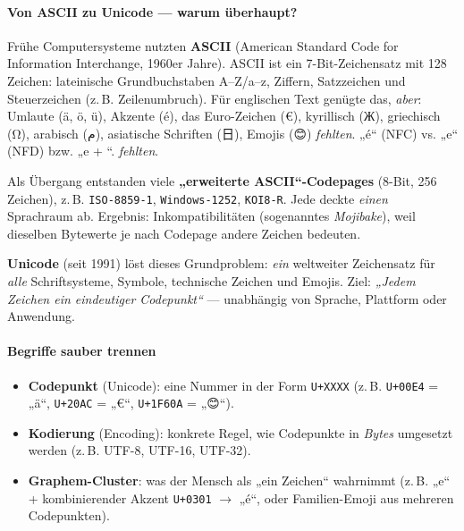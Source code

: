 \documentclass[../skript/main.tex]{subfiles}
\begin{document}
\paragraph{Von ASCII zu Unicode — warum überhaupt?}
Frühe Computersysteme nutzten \textbf{ASCII} (American Standard Code for Information Interchange, 1960er Jahre). ASCII ist ein 7-Bit-Zeichensatz mit 128 Zeichen: lateinische Grundbuchstaben A–Z/a–z, Ziffern, Satzzeichen und Steuerzeichen (z.\,B. Zeilenumbruch). Für englischen Text genügte das, \emph{aber}:
Umlaute (ä, ö, ü), Akzente (é), das Euro-Zeichen (€), kyrillisch (Ж), griechisch (Ω), arabisch ({\arabicfont م}), asiatische Schriften ({\cjkfont 日}), Emojis ({\emojifont 😊}) \emph{fehlten}.
„é“ (NFC) vs. „e\combacute“ (NFD) bzw. „e + \dottedcircle\combacute“.
\emph{fehlten}.


Als Übergang entstanden viele \textbf{„erweiterte ASCII“-Codepages} (8-Bit, 256 Zeichen), z.\,B. \texttt{ISO-8859-1}, \texttt{Windows-1252}, \texttt{KOI8-R}. Jede deckte \emph{einen} Sprachraum ab. Ergebnis: Inkompatibilitäten (sogenanntes \emph{Mojibake}), weil dieselben Bytewerte je nach Codepage andere Zeichen bedeuten.

\textbf{Unicode} (seit 1991) löst dieses Grundproblem: \emph{ein} weltweiter Zeichensatz für \emph{alle} Schriftsysteme, Symbole, technische Zeichen und Emojis. Ziel: \emph{„Jedem Zeichen ein eindeutiger Codepunkt“} — unabhängig von Sprache, Plattform oder Anwendung.

\paragraph{Begriffe sauber trennen}
\begin{itemize}
	\item \textbf{Codepunkt} (Unicode): eine Nummer in der Form \texttt{U+XXXX} (z.\,B. \texttt{U+00E4} = „ä“, \texttt{U+20AC} = „€“, \texttt{U+1F60A} = „😊“).
	\item \textbf{Kodierung} (Encoding): konkrete Regel, wie Codepunkte in \emph{Bytes} umgesetzt werden (z.\,B. UTF-8, UTF-16, UTF-32).
	\item \textbf{Graphem-Cluster}: was der Mensch als „ein Zeichen“ wahrnimmt (z.\,B. „e“ + kombinierender Akzent \texttt{U+0301} $\to$ „é“, oder Familien-Emoji aus mehreren Codepunkten).
\end{itemize}
\end{document}
